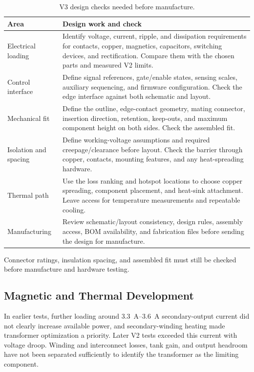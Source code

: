 \begin{table}[H]
\centering
\small
\caption[V3 design and release requirements.]{V3 design checks needed before manufacture.}
\label{tab:hw-v3-design-brief}
\begin{tabularx}{\textwidth}{@{}L{0.25\textwidth}Y@{}}
\toprule
Area & Design work and check\\
\midrule
Electrical loading & Identify voltage, current, ripple, and dissipation requirements for contacts, copper, magnetics, capacitors, switching devices, and rectification. Compare them with the chosen parts and measured V2 limits.\\
Control interface & Define signal references, gate/enable states, sensing scales, auxiliary sequencing, and firmware configuration. Check the edge interface against both schematic and layout.\\
Mechanical fit & Define the outline, edge-contact geometry, mating connector, insertion direction, retention, keep-outs, and maximum component height on both sides. Check the assembled fit.\\
Isolation and spacing & Define working-voltage assumptions and required creepage/clearance before layout. Check the barrier through copper, contacts, mounting features, and any heat-spreading hardware.\\
Thermal path & Use the loss ranking and hotspot locations to choose copper spreading, component placement, and heat-sink attachment. Leave access for temperature measurements and repeatable cooling.\\
Manufacturing & Review schematic/layout consistency, design rules, assembly access, BOM availability, and fabrication files before sending the design for manufacture.\\
\bottomrule
\end{tabularx}
\end{table}

Connector ratings, insulation spacing, and assembled fit must still be
checked before manufacture and hardware testing.

\subsection{Magnetic and Thermal Development}

In earlier tests, further loading around \SIrange{3.3}{3.6}{\ampere} secondary-output current did not clearly increase available power, and secondary-winding heating made transformer optimization a priority. Later V2 tests exceeded this current with voltage droop. Winding and interconnect losses, tank gain, and output headroom have not been separated sufficiently to identify the transformer as the limiting component.

